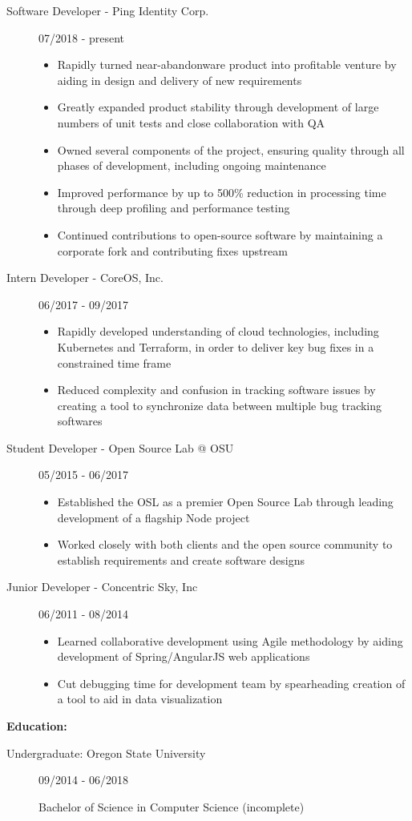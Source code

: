 \documentclass[11pt]{article}
\begin{document}
\begin{description}

\item[Software Developer - Ping Identity Corp.]
\hfill 07/2018 - present
\begin{itemize}
\item Rapidly turned near-abandonware product into profitable venture by aiding in design and delivery of new requirements
\item Greatly expanded product stability through development of large numbers of unit tests and close collaboration with QA
\item Owned several components of the project, ensuring quality through all phases of development, including ongoing maintenance
\item Improved performance by up to 500\% reduction in processing time through deep profiling and performance testing
\item Continued contributions to open-source software by maintaining a corporate fork and contributing fixes upstream
\end{itemize}

\item [Intern Developer - CoreOS, Inc.]
\hfill 06/2017 - 09/2017
\begin{itemize}
\item Rapidly developed understanding of cloud technologies, including Kubernetes and Terraform, in order to deliver key bug fixes in a constrained time frame
\item Reduced complexity and confusion in tracking software issues by creating a tool to synchronize data between multiple bug tracking softwares
\end{itemize}

\item[Student Developer - Open Source Lab @ OSU]
\hfill 05/2015 - 06/2017
\begin{itemize}
\item Established the OSL as a premier Open Source Lab through leading development of a flagship Node project
\item Worked closely with both clients and the open source community to establish requirements and create software designs
\end{itemize}

\item[Junior Developer - Concentric Sky, Inc]
\hfill 06/2011 - 08/2014
\begin{itemize}
\item Learned collaborative development using Agile methodology by aiding development of Spring/AngularJS web applications
\item Cut debugging time for development team by spearheading creation of a tool to aid in data visualization
\end{itemize}
\end{description}
\smallskip
{\huge \textbf{Education:}}
\hrulefill
\begin{description}
\item[Undergraduate: Oregon State University]
\hfill 09/2014 - 06/2018

		Bachelor of Science in Computer Science (incomplete)
\end{description}
\end{document}
